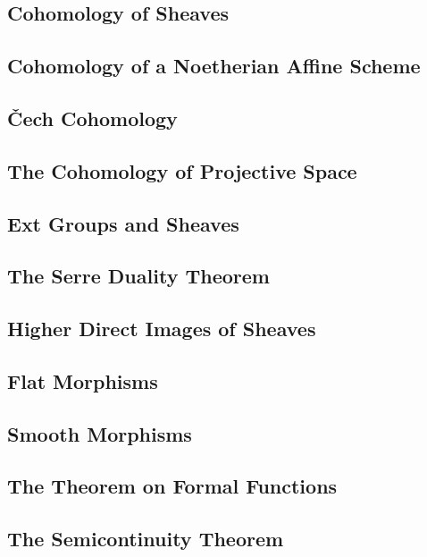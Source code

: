 \documentclass[11pt, a4paper]{article}
\begin{document}
\subsection{Cohomology of Sheaves}

\subsection{Cohomology of a Noetherian Affine Scheme}

\subsection{\v{C}ech Cohomology}

\subsection{The Cohomology of Projective Space}

\subsection{Ext Groups and Sheaves}

\subsection{The Serre Duality Theorem}

\subsection{Higher Direct Images of Sheaves}

\subsection{Flat Morphisms}

\subsection{Smooth Morphisms}

\subsection{The Theorem on Formal Functions}

\subsection{The Semicontinuity Theorem}
\end{document}
